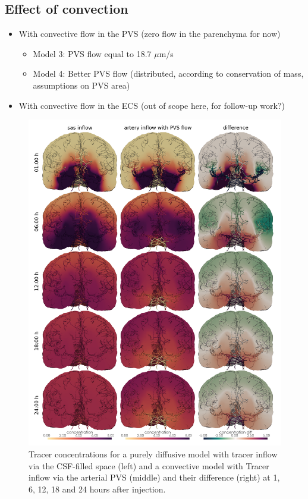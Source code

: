 \documentclass[fleqn,10pt]{wlscirep}
\begin{document}
\begin{figure}
    \caption{}
    \label{fig:1}
\end{figure}

\subsection*{Effect of convection}
\begin{itemize}
    \item 
    With convective flow in the PVS (zero flow in the parenchyma for now)
    \begin{itemize}
        \item 
        Model 3: PVS flow equal to 18.7 $\mu$m/s
        \item 
        Model 4: Better PVS flow (distributed, according to conservation of mass, assumptions on PVS area)
    \end{itemize}    
    \item 
    With convective flow in the ECS (out of scope here, for follow-up work?)
\end{itemize}

\begin{figure}
    \centering
    \includegraphics[width = 0.9 \textwidth]{modelB_modelC_overview.png}
    \caption{Tracer concentrations for a purely diffusive model with tracer inflow via the CSF-filled space (left) and a convective model with Tracer inflow via the arterial PVS (middle) and their difference (right) at 1, 6, 12, 18 and 24 hours after injection.}
    \label{fig:2}
\end{figure}
\end{document}
